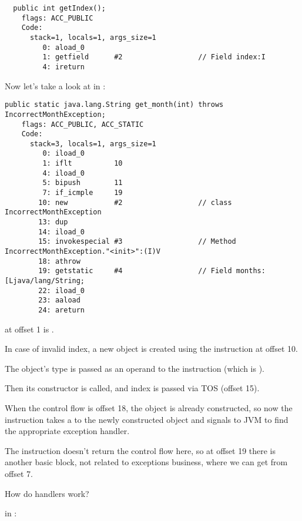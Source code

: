 \begin{lstlisting}
  public int getIndex();
    flags: ACC_PUBLIC
    Code:
      stack=1, locals=1, args_size=1
         0: aload_0       
         1: getfield      #2                  // Field index:I
         4: ireturn       
\end{lstlisting}

Now let's take a look at  in :

\begin{lstlisting}[caption=Month2.class]
  public static java.lang.String get_month(int) throws IncorrectMonthException;
    flags: ACC_PUBLIC, ACC_STATIC
    Code:
      stack=3, locals=1, args_size=1
         0: iload_0       
         1: iflt          10
         4: iload_0       
         5: bipush        11
         7: if_icmple     19
        10: new           #2                  // class IncorrectMonthException
        13: dup           
        14: iload_0       
        15: invokespecial #3                  // Method IncorrectMonthException."<init>":(I)V
        18: athrow        
        19: getstatic     #4                  // Field months:[Ljava/lang/String;
        22: iload_0       
        23: aaload        
        24: areturn       
\end{lstlisting}

 at offset 1 is .

In case of invalid index, a new object is created using the  instruction at offset 10.

The object's type is passed as an operand to the instruction (which is ).

Then its constructor is called, and index is passed via \ac{TOS} (offset 15).

When the control flow is offset 18, the object is already constructed, 
so now the  instruction takes a  
to the newly constructed object and signals to \ac{JVM} to find the appropriate exception handler.

The  instruction doesn't return the control flow here, 
so at offset 19 there is another \gls{basic block},
not related to exceptions business, where we can get from offset 7.

How do handlers work?

\main in :

